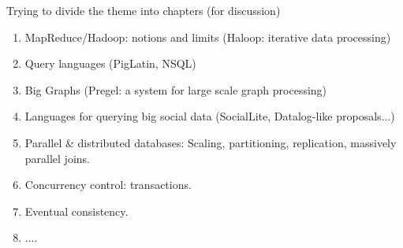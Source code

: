 \documentclass{beamer}
\begin{document}
\begin{frame}{Trying to divide the theme into chapters (for discussion)}


\begin{enumerate}
\item MapReduce/Hadoop: notions and limits (Haloop: iterative data processing)
\item Query languages (PigLatin, NSQL)
\item  Big Graphs (Pregel: a system for large scale graph processing)
\item Languages for querying big social data (SocialLite, Datalog-like proposals...)
\item Parallel \& distributed databases: Scaling, partitioning, replication, massively parallel joins.
\item Concurrency control: transactions.
\item Eventual consistency.
\item ....
\end{enumerate}

\end{frame}
 
 
 
 
\end{document}
